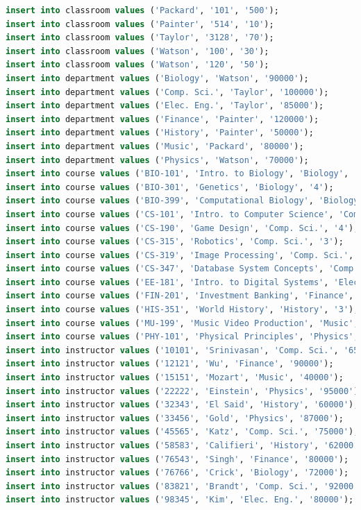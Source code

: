 \documentclass{article}
\begin{document}
\begin{lstlisting}[language=sql]
insert into classroom values ('Packard', '101', '500');
insert into classroom values ('Painter', '514', '10');
insert into classroom values ('Taylor', '3128', '70');
insert into classroom values ('Watson', '100', '30');
insert into classroom values ('Watson', '120', '50');
insert into department values ('Biology', 'Watson', '90000');
insert into department values ('Comp. Sci.', 'Taylor', '100000');
insert into department values ('Elec. Eng.', 'Taylor', '85000');
insert into department values ('Finance', 'Painter', '120000');
insert into department values ('History', 'Painter', '50000');
insert into department values ('Music', 'Packard', '80000');
insert into department values ('Physics', 'Watson', '70000');
insert into course values ('BIO-101', 'Intro. to Biology', 'Biology', '4');
insert into course values ('BIO-301', 'Genetics', 'Biology', '4');
insert into course values ('BIO-399', 'Computational Biology', 'Biology', '3');
insert into course values ('CS-101', 'Intro. to Computer Science', 'Comp. Sci.', '4');
insert into course values ('CS-190', 'Game Design', 'Comp. Sci.', '4');
insert into course values ('CS-315', 'Robotics', 'Comp. Sci.', '3');
insert into course values ('CS-319', 'Image Processing', 'Comp. Sci.', '3');
insert into course values ('CS-347', 'Database System Concepts', 'Comp. Sci.', '3');
insert into course values ('EE-181', 'Intro. to Digital Systems', 'Elec. Eng.', '3');
insert into course values ('FIN-201', 'Investment Banking', 'Finance', '3');
insert into course values ('HIS-351', 'World History', 'History', '3');
insert into course values ('MU-199', 'Music Video Production', 'Music', '3');
insert into course values ('PHY-101', 'Physical Principles', 'Physics', '4');
insert into instructor values ('10101', 'Srinivasan', 'Comp. Sci.', '65000');
insert into instructor values ('12121', 'Wu', 'Finance', '90000');
insert into instructor values ('15151', 'Mozart', 'Music', '40000');
insert into instructor values ('22222', 'Einstein', 'Physics', '95000');
insert into instructor values ('32343', 'El Said', 'History', '60000');
insert into instructor values ('33456', 'Gold', 'Physics', '87000');
insert into instructor values ('45565', 'Katz', 'Comp. Sci.', '75000');
insert into instructor values ('58583', 'Califieri', 'History', '62000');
insert into instructor values ('76543', 'Singh', 'Finance', '80000');
insert into instructor values ('76766', 'Crick', 'Biology', '72000');
insert into instructor values ('83821', 'Brandt', 'Comp. Sci.', '92000');
insert into instructor values ('98345', 'Kim', 'Elec. Eng.', '80000');

\end{lstlisting}
\end{document}
